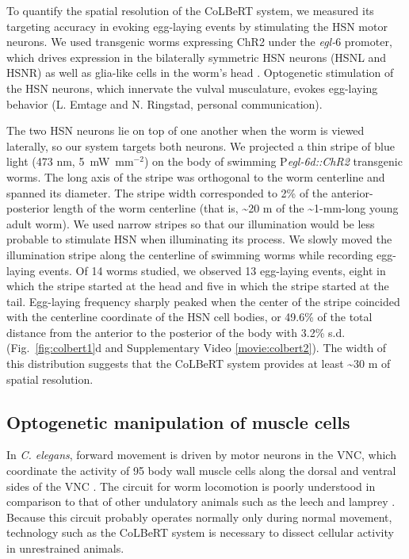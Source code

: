 To quantify the spatial resolution of the CoLBeRT system, we measured its targeting accuracy in evoking egg-laying events by stimulating the HSN motor neurons. We used transgenic worms expressing ChR2 under the \textit{egl-$6$} promoter, which drives expression in the bilaterally symmetric HSN neurons (HSNL and HSNR) as well as glia-like cells in the worm's head  \citep{ringstad_fmrfamide_2008}. Optogenetic stimulation of the HSN neurons, which innervate the vulval musculature, evokes egg-laying behavior (L. Emtage and N. Ringstad, personal communication).

The two HSN neurons lie on top of one another when the worm is viewed laterally, so our system targets both neurons. We projected a thin stripe of blue light (473 nm, 5~mW~mm$^{-2}$) on the body of swimming P\textit{egl-6d::ChR2} transgenic worms. The long axis of the stripe was orthogonal to the worm centerline and spanned its diameter. The stripe width corresponded to 2\% of the anterior-posterior length of the worm centerline (that is, \textasciitilde20 \textmu m of the \textasciitilde1-mm-long young adult worm). We used narrow stripes so that our illumination would be less probable to stimulate HSN when illuminating its process. We slowly moved the illumination stripe along the centerline of swimming worms while recording egg-laying events. Of 14 worms studied, we observed 13 egg-laying events, eight in which the stripe started at the head and five in which the stripe started at the tail. Egg-laying frequency sharply peaked when the center of the stripe coincided with the centerline coordinate of the HSN cell bodies, or 49.6\% of the total distance from the anterior to the posterior of the body with 3.2\% s.d. (Fig.~\ref{fig:colbert1}d and Supplementary Video \ref{movie:colbert2}). The width of this distribution suggests that the CoLBeRT system provides at least \textasciitilde30 \textmu m of spatial resolution.


\subsection{Optogenetic manipulation of muscle cells}
In \textit{C. elegans}, forward movement is driven by motor neurons in the VNC, which coordinate the activity of 95 body wall muscle cells along the dorsal and ventral sides of the VNC \citep{von_stetina_motor_2006}. The circuit for worm locomotion is poorly understood in comparison to that of other undulatory animals such as the leech and lamprey \citep{marder_principles_1996, bryden_neural_2008, karbowski_systems_2008}. Because this circuit probably operates normally only during normal movement, technology such as the CoLBeRT system is necessary to dissect cellular activity in unrestrained animals.

